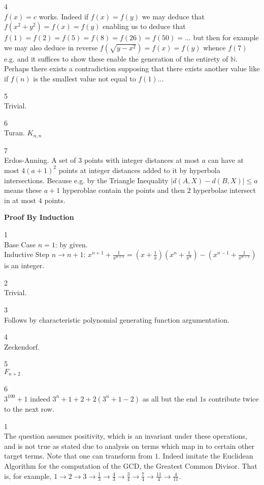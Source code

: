 4 \\
$\boxed{f(x)=c}$ works. Indeed if $f(x)=f(y)$ we may deduce that $f(x^2+y^2)=f(x)=f(y)$ enabling us to deduce that $f(1)=f(2)=f(5)=f(8)=f(26)=f(50)=\dots$ but then for example we may also deduce in reverse $f(\sqrt{y-x^2})=f(x)=f(y)$ whence $f(7)$ e.g. and it suffices to show these enable the generation of the entirety of $\mathbb{N}$. Perhaps there exists a contradiction supposing that there exists another value like if $f(n)$ is the smallest value not equal to $f(1)$...

5 \\
Trivial.

6 \\
Turan. $K_{n,n}$

7 \\
Erdos-Anning. A set of $3$ points with integer distances at most $a$ can have at most $4(a+1)^2$ points at integer distances added to it by hyperbola intersections. Because e.g. by the Triangle Inequality $|d(A,X)-d(B,X)| \le a$ means these $a+1$ hyperoblae contain the points and then $2$ hyperbolae intersect in at most $4$ points.

\newpage

\textbf{Proof By Induction}

1 \\
Base Case $n=1$: by given. \\
Inductive Step $n \to n+1$: $x^{n+1}+\frac{1}{x^{n+1}}=\left(x+\frac{1}{x} \right)\left(x^n+\frac{1}{x^n} \right)-\left(x^{n-1}+\frac{1}{x^{n-1}} \right)$ is an integer.

2 \\
Trivial.

3 \\
Follows by characteristic polynomial generating function argumentation.

4 \\
Zeckendorf.

5 \\
$\boxed{F_{n+2}}$

6 \\
$\boxed{3^{100}+1}$ indeed $3^n+1+2+2(3^n+1-2)$ as all but the end $1$s contribute twice to the next row.

1 \\
The question assumes positivity, which is an invariant under these operations, and is not true as stated due to analysis on terms which map in to certain other target terms. Note that one can transform from $1$. Indeed imitate the Euclidean Algorithm for the computation of the GCD, the Greatest Common Divisor. That is, for example, $1 \to 2 \to 3 \to \frac{1}{3} \to \frac{4}{3} \to \frac{3}{4} \to \frac{7}{4} \to \frac{11}{4} \to \frac{4}{11}$.

